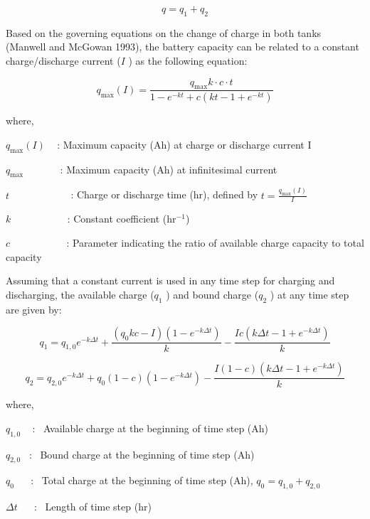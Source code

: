 \begin{equation}
q = {q_1} + {q_2}
\end{equation}

Based on the governing equations on the change of charge in both tanks (Manwell and McGowan 1993), the battery capacity can be related to a constant charge/discharge current (\(I\) ) as the following equation:

\begin{equation}
{q_{\max }}(I) = \frac{{{q_{\max }}k \cdot c \cdot t}}{{1 - {e^{ - kt}} + c(kt - 1 + {e^{ - kt}})}}
\end{equation}

where,

\({q_{\max }}(I)\) ~ : Maximum capacity (Ah) at charge or discharge current I

\({q_{\max }}\) ~~~~~~ : Maximum capacity (Ah) at infinitesimal current

\(t\) ~~~~~~~~~~~ : Charge or discharge time (hr), defined by \(t = \frac{{{q_{\max }}(I)}}{I}\)

\(k\) ~~~~~~~~~~ : Constant coefficient (hr\(^{-1}\))

\(c\) ~~~~~~~~~~ : Parameter indicating the ratio of available charge capacity to total capacity

Assuming that a constant current is used in any time step for charging and discharging, the available charge (\({q_1}\) ) and bound charge (\({q_2}\) ) at any time step are given by:

\begin{equation}
{q_1} = {q_{1,0}}{e^{ - k\Delta t}} + \frac{{({q_0}kc - I)(1 - {e^{ - k\Delta t}})}}{k} - \frac{{Ic(k\Delta t - 1 + {e^{ - k\Delta t}})}}{k}
\end{equation}

\begin{equation}
{q_2} = {q_{2,0}}{e^{ - k\Delta t}} + {q_0}(1 - c)(1 - {e^{ - k\Delta t}}) - \frac{{I(1 - c)(k\Delta t - 1 + {e^{ - k\Delta t}})}}{k}
\end{equation}

where,

\({q_{1,0}}\) ~ :~ Available charge at the beginning of time step (Ah)

\({q_{2,0}}\) ~:~ Bound charge at the beginning of time step (Ah)

\({q_0}\) ~~ :~ Total charge at the beginning of time step (Ah), \({q_0} = {q_{1,0}} + {q_{2,0}}\)

\(\Delta t\) ~~ :~ Length of time step (hr)

